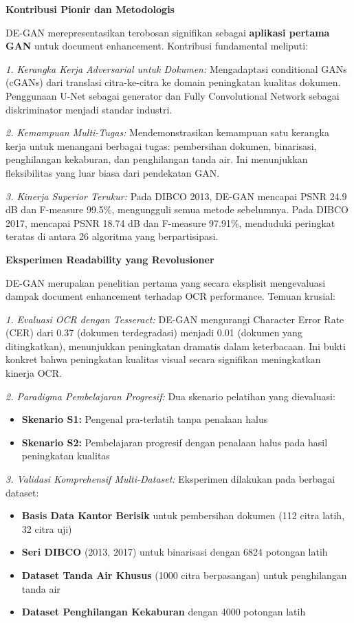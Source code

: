 \documentclass[12pt,a4paper]{article}
\begin{document}
\textbf{Kontribusi Pionir dan Metodologis}

DE-GAN merepresentasikan terobosan signifikan sebagai \textbf{aplikasi pertama GAN} untuk document enhancement. Kontribusi fundamental meliputi:

\textit{1. Kerangka Kerja Adversarial untuk Dokumen:} Mengadaptasi conditional GANs (cGANs) dari translasi citra-ke-citra ke domain peningkatan kualitas dokumen. Penggunaan U-Net sebagai generator dan Fully Convolutional Network sebagai diskriminator menjadi standar industri.

\textit{2. Kemampuan Multi-Tugas:} Mendemonstrasikan kemampuan satu kerangka kerja untuk menangani berbagai tugas: pembersihan dokumen, binarisasi, penghilangan kekaburan, dan penghilangan tanda air. Ini menunjukkan fleksibilitas yang luar biasa dari pendekatan GAN.

\textit{3. Kinerja Superior Terukur:} Pada DIBCO 2013, DE-GAN mencapai PSNR 24.9 dB dan F-measure 99.5\%, mengungguli semua metode sebelumnya. Pada DIBCO 2017, mencapai PSNR 18.74 dB dan F-measure 97.91\%, menduduki peringkat teratas di antara 26 algoritma yang berpartisipasi.

\textbf{Eksperimen Readability yang Revolusioner}

DE-GAN merupakan penelitian pertama yang secara eksplisit mengevaluasi dampak document enhancement terhadap OCR performance. Temuan krusial:

\textit{1. Evaluasi OCR dengan Tesseract:} DE-GAN mengurangi Character Error Rate (CER) dari 0.37 (dokumen terdegradasi) menjadi 0.01 (dokumen yang ditingkatkan), menunjukkan peningkatan dramatis dalam keterbacaan. Ini bukti konkret bahwa peningkatan kualitas visual secara signifikan meningkatkan kinerja OCR.

\textit{2. Paradigma Pembelajaran Progresif:} Dua skenario pelatihan yang dievaluasi:
\begin{itemize}
    \item \textbf{Skenario S1:} Pengenal pra-terlatih tanpa penalaan halus
    \item \textbf{Skenario S2:} Pembelajaran progresif dengan penalaan halus pada hasil peningkatan kualitas
\end{itemize}

\textit{3. Validasi Komprehensif Multi-Dataset:} Eksperimen dilakukan pada berbagai dataset:
\begin{itemize}
    \item \textbf{Basis Data Kantor Berisik} untuk pembersihan dokumen (112 citra latih, 32 citra uji)
    \item \textbf{Seri DIBCO} (2013, 2017) untuk binarisasi dengan 6824 potongan latih
    \item \textbf{Dataset Tanda Air Khusus} (1000 citra berpasangan) untuk penghilangan tanda air
    \item \textbf{Dataset Penghilangan Kekaburan} dengan 4000 potongan latih
\end{itemize}
\end{document}
